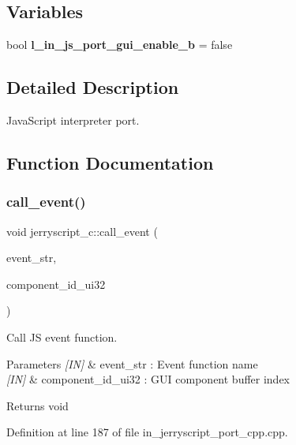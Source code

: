 \subsection*{Variables}
\begin{DoxyCompactItemize}
\item 
bool \textbf{ l\+\_\+in\+\_\+js\+\_\+port\+\_\+gui\+\_\+enable\+\_\+b} = false
\end{DoxyCompactItemize}


\subsection{Detailed Description}
Java\+Script interpreter port. 



\subsection{Function Documentation}
\mbox{\label{group___port_ga8337a400e02afeccd827f34fed4a939b}} 
\subsubsection{call\_event()}
{\footnotesize\ttfamily void jerryscript\+\_\+c\+::call\+\_\+event (\begin{DoxyParamCaption}\item[{wx\+String}]{event\+\_\+str,  }\item[{uint32\+\_\+t}]{component\+\_\+id\+\_\+ui32 }\end{DoxyParamCaption})}



Call JS event function. 


\begin{DoxyParams}{Parameters}
{\em \mbox{[}\+I\+N\mbox{]}} & event\+\_\+str \+: Event function name \\
\hline
{\em \mbox{[}\+I\+N\mbox{]}} & component\+\_\+id\+\_\+ui32 \+: G\+UI component buffer index \\
\hline
\end{DoxyParams}
\begin{DoxyReturn}{Returns}
void 
\end{DoxyReturn}


Definition at line 187 of file in\+\_\+jerryscript\+\_\+port\+\_\+cpp.\+cpp.

